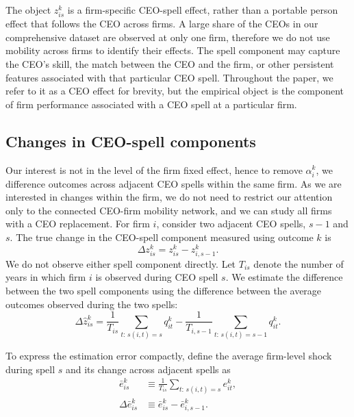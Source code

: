 \documentclass[sigconf,nonacm]{acmart}
\begin{document}
The object $z_{is}^{k}$ is a firm-specific CEO-spell effect, rather than
a portable person effect that follows the CEO across firms. A large share of the CEOs
in our comprehensive dataset are observed at only one firm, therefore we do not use mobility
across firms to identify their effects. The spell component may capture
the CEO's skill, the match between the CEO and the firm, or other
persistent features associated with that particular CEO spell.
Throughout the paper, we refer to it as a CEO effect for
brevity, but the empirical object is the component of firm performance
associated with a CEO spell at a particular firm.

\subsection{Changes in CEO-spell components}\label{subsec:spell_changes}

Our interest is not in the level of the firm fixed effect, hence to remove $\alpha_i^{k}$, we difference outcomes across adjacent CEO spells within the same firm. As we are interested in changes within the firm, we do not need to restrict our attention only to the connected CEO-firm mobility network, and we can study all firms with a CEO replacement. For firm $i$, consider two adjacent CEO spells, $s-1$ and $s$. The
true change in the CEO-spell component measured using outcome $k$ is
\begin{equation}
\Delta z_{is}^{k}
=
z_{is}^{k}
-
z_{i,s-1}^{k}.
\label{eq:true_spell_change}
\end{equation}
We do not observe either spell component directly. Let $T_{is}$
denote the number of years in which firm $i$ is observed during CEO
spell $s$. We estimate the difference between the two spell components
using the difference between the average outcomes observed during the
two spells:
\begin{equation}
\Delta\widehat z_{is}^{k}
=
\frac{1}{T_{is}}
\sum_{t:\,s(i,t)=s}
q_{it}^{k}
-
\frac{1}{T_{i,s-1}}
\sum_{t:\,s(i,t)=s-1}
q_{it}^{k}.
\label{eq:estimated_spell_change}
\end{equation}
\begin{samepage}
To express the estimation error compactly, define the average firm-level shock during spell $s$ and its change across adjacent spells as
\begin{equation}
\begin{aligned}
\bar e_{is}^{k}
&\equiv
\frac{1}{T_{is}}
\sum_{t:\,s(i,t)=s} e_{it}^{k},\\
\Delta\bar e_{is}^{k}
&\equiv
\bar e_{is}^{k}
-
\bar e_{i,s-1}^{k}.
\end{aligned}
\label{eq:spell_average_shock}
\end{equation}
\end{samepage}
\end{document}
